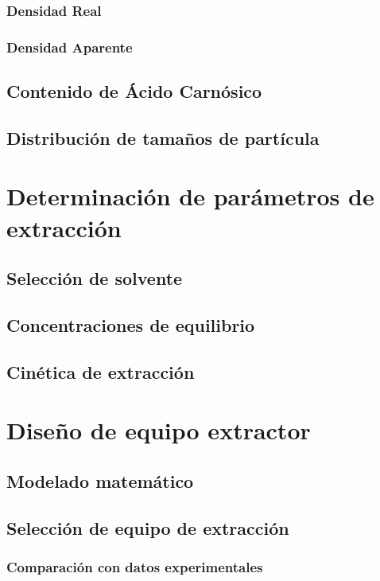\documentclass[11pt,a4paper]{article}
\begin{document}
\subsubsection{Densidad Real}
\subsubsection{Densidad Aparente}
\subsection{Contenido de Ácido Carnósico\label{contenido_ac}}
\subsection{Distribución de tamaños de partícula}

\section{Determinación de parámetros de extracción\label{ext_param}}
\subsection{Selección de solvente\label{selec_solvent}}
\subsection{Concentraciones de equilibrio\label{equi}}
\subsection{Cinética de extracción\label{cine}}

\section{Diseño de equipo extractor}

\subsection{Modelado matemático}
\subsection{Selección de equipo de extracción}
\subsubsection{Comparación con datos experimentales}
\end{document}
